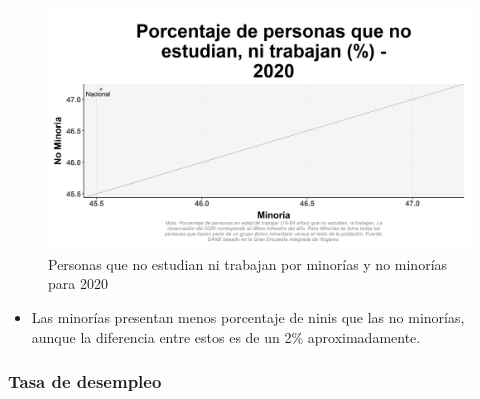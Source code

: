     \begin{figure}[H]
        \caption{Personas que no estudian ni trabajan por minorías y no minorías para 2020 \label{map_result_2} }
        \begin{center}
        \includegraphics[width=\textwidth,keepaspectratio]{img/var_34_scatter.png}
        \end{center}
    \end{figure}
            \begin{itemize}
                \item Las minorías presentan menos porcentaje de ninis que las no minorías, aunque la diferencia entre estos es de un 2\% aproximadamente.
                \end{itemize}

        \subsubsection{Tasa de desempleo}


